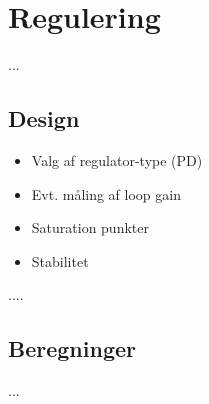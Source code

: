 \section{Regulering}\label{sec:regulering}

...
\subsection{Design}

\begin{itemize}
	\item Valg af regulator-type (PD)
	\item Evt. måling af loop gain 
	\item Saturation punkter
	\item Stabilitet
\end{itemize}
....
\subsection{Beregninger}
...